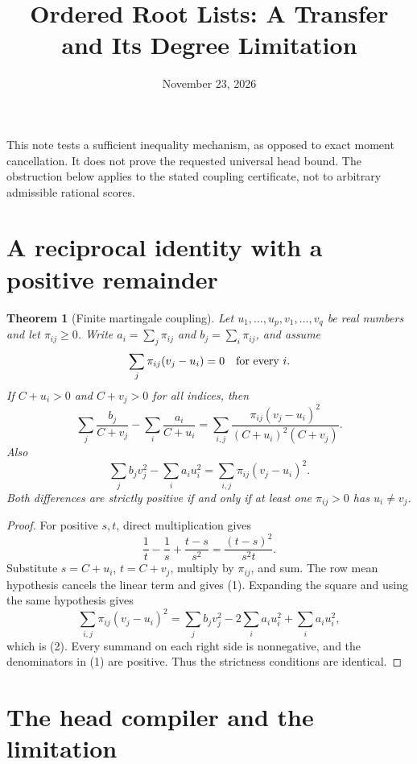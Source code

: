 \documentclass[11pt]{article}
\newtheorem{theorem}{Theorem}
\begin{document}
\title{Ordered Root Lists: A Transfer and Its Degree Limitation}
\author{}
\date{November 23, 2026}
\maketitle

This note tests a sufficient inequality mechanism, as opposed to exact
moment cancellation. It does not prove the requested universal head bound.
The obstruction below applies to the stated coupling certificate, not
to arbitrary admissible rational scores.

\section{A reciprocal identity with a positive remainder}

\begin{theorem}[Finite martingale coupling]
Let $u_1,\ldots,u_p,v_1,\ldots,v_q$ be real numbers and let
$\pi_{ij}\ge0$. Write $a_i=\sum_j\pi_{ij}$ and
$b_j=\sum_i\pi_{ij}$, and assume
\[
                  \sum_j\pi_{ij}(v_j-u_i)=0
                  \quad\hbox{for every }i.
\]
If $C+u_i>0$ and $C+v_j>0$ for all indices, then
\[
 \sum_j\frac{b_j}{C+v_j}-\sum_i\frac{a_i}{C+u_i}
 =\sum_{i,j}\frac{\pi_{ij}(v_j-u_i)^2}
                         {(C+u_i)^2(C+v_j)}.
 \tag{1}
\]
Also
\[
 \sum_j b_jv_j^2-\sum_i a_iu_i^2
             =\sum_{i,j}\pi_{ij}(v_j-u_i)^2.
 \tag{2}
\]
Both differences are strictly positive if and only if at least one
$\pi_{ij}>0$ has $u_i\ne v_j$.
\end{theorem}

\begin{proof}
For positive $s,t$, direct multiplication gives
\[
                 \frac1t-\frac1s+\frac{t-s}{s^2}
                         =\frac{(t-s)^2}{s^2t}.
\]
Substitute $s=C+u_i$, $t=C+v_j$, multiply by $\pi_{ij}$,
and sum. The row mean hypothesis cancels the linear term and gives
(1). Expanding the square and using the same hypothesis gives
\[
 \sum_{i,j}\pi_{ij}(v_j-u_i)^2
  =\sum_jb_jv_j^2-2\sum_i a_iu_i^2+\sum_i a_iu_i^2,
\]
which is (2). Every summand on each right side is nonnegative,
and the denominators in (1) are positive. Thus the strictness
conditions are identical.
\end{proof}

\section{The head compiler and the limitation}
\end{document}
